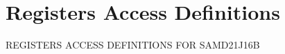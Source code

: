 \hypertarget{group___s_a_m_d21_j16_b__reg}{}\section{Registers Access Definitions}
\label{group___s_a_m_d21_j16_b__reg}
R\+E\+G\+I\+S\+T\+E\+RS A\+C\+C\+E\+SS D\+E\+F\+I\+N\+I\+T\+I\+O\+NS F\+OR S\+A\+M\+D21\+J16B 